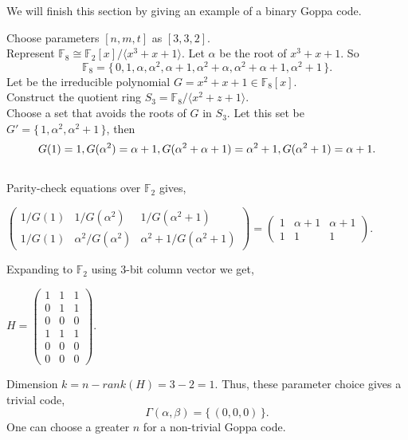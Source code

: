 We will finish this section by giving an example of a binary Goppa code.
\begin{exmp}
    Choose parameters $[n, m, t]$ as $[3, 3, 2]$.\\
    Represent $\mathbb{F}_8 \cong \mathbb{F}_2[x]/ \langle x^3+x+1 \rangle$. Let $\alpha$ be the root of $x^3+x+1$. So \[\mathbb{F}_8 = \{\,0,1,\alpha,\alpha^2,\alpha+1,\alpha^2+\alpha, \alpha^2+\alpha+1,\alpha^2+1\,\}.\] 
    Let be the irreducible polynomial $G = x^2+x+1 \in \mathbb{F}_8[x]$.\\
    Construct the quotient ring $S_3 = \mathbb{F}_8/\langle x^2+z+1\rangle.$\\
    Choose a set that avoids the roots of $G$ in $S_3$. Let this set be 
    $G'=\{\,1, \alpha^2,\alpha^2+1\,\}$, then
    \[        
    \noindent G(1)=1\\,G(\alpha^2)=\alpha+1\\,
    G(\alpha^2+\alpha+1)=\alpha^2+1\\,G(\alpha^2+1)=\alpha+1.
    \]\\
    Parity-check equations over $\mathbb{F}_2$ gives,
\begin{center}
    $\begin{pmatrix}
    1/G(1) &1/G(\alpha^2)& 1/G(\alpha^2+1)\\
    1/G(1) &\alpha^2/G(\alpha^2)& \alpha^2+1/G(\alpha^2+1)
    \end{pmatrix} = \begin{pmatrix}
    1 & \alpha+1 & \alpha+1\\
    1 & 1 & 1
    \end{pmatrix}.$\\[0.4cm]
\end{center}
    Expanding to $\mathbb{F}_2$ using 3-bit column vector we get,
\begin{center}
    $H=\begin{pmatrix}
        1&1&1\\
        0&1&1\\
        0&0&0\\
        1&1&1\\
        0&0&0\\
        0&0&0
    \end{pmatrix}.$\\[0.4cm]
\end{center}
    Dimension $k = n-rank(H)=3-2=1$. Thus, these parameter choice gives a trivial code, \[\Gamma(\alpha, \beta) = \{\,(0,0,0)\,\}.\]
    One can choose a greater $n$ for a non-trivial Goppa code.
\end{exmp}


